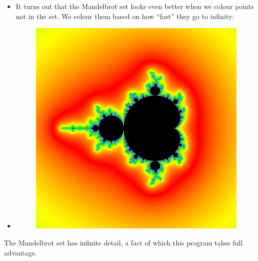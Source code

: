 \documentclass{beamer}
\begin{document}
\frame
{
\begin{itemize}
\item <1->It turns out that the Mandelbrot set looks even better when we colour points not in the set. We colour them based on how ``fast'' they go to infinity:
\item <2-> \begin{figure}
\centering
\includegraphics[scale=0.15]{presentation_images/mandelbrot_coloured.jpg} %
\end{figure}
\end{itemize}
}

\frame
{
The Mandelbrot set has infinite detail, a fact of which this program takes full advantage.
}
\end{document}
